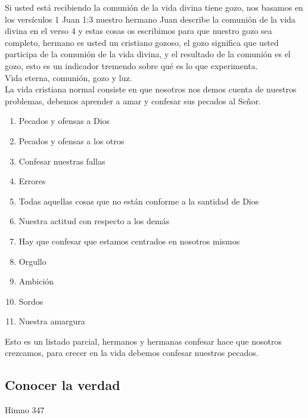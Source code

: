 \documentclass[12pt]{article}
\begin{document}
Si usted está recibiendo la comunión de la vida divina tiene gozo, nos basamos en los versículos 1 Juan 1:3 nuestro hermano Juan describe la comunión de la vida divina en el verso 4 y estas cosas os escribimos para que nuestro gozo sea completo, hermano es usted un cristiano gozoso, el gozo significa que usted participa de la comunión de la vida divina, y el resultado de la comunión es el gozo, esto es un indicador tremendo sobre qué es lo que experimenta.\\

Vida eterna, comunión, gozo y luz.\\

La vida cristiana normal consiste en que nosotros nos demos cuenta de nuestros problemas, debemos aprender a amar y confesar sus pecados al Señor.\\

\begin{enumerate}

\item Pecados y ofensas a Dios
\item Pecados y ofensas a los otros
\item Confesar nuestras fallas
\item Errores
\item Todas aquellas cosas que no están conforme a la santidad de Dios
\item Nuestra actitud con respecto a los demás 
\item Hay que confesar que estamos centrados en nosotros mismos
\item Orgullo 
\item Ambición 
\item Sordos 
\item Nuestra amargura

\end{enumerate} 

Esto es un listado parcial, hermanos y hermanas confesar hace que nosotros crezcamos, para crecer en la vida debemos confesar nuestros pecados.\\

\subsection*{Conocer la verdad}

Himno 347\\
\end{document}
